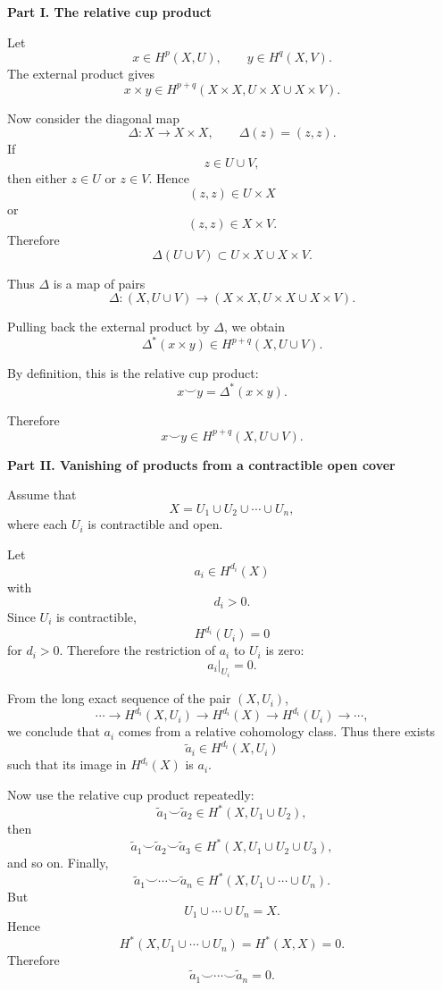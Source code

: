 \begin{solution}

\medskip
\noindent\textbf{Part I. The relative cup product}\par
\smallskip


Let
\[
x\in H^p(X,U),
\qquad
y\in H^q(X,V).
\]
The external product gives
\[
x\times y
\in
H^{p+q}(X\times X, U\times X\cup X\times V).
\]

Now consider the diagonal map
\[
\Delta:X\to X\times X,
\qquad
\Delta(z)=(z,z).
\]
If
\[
z\in U\cup V,
\]
then either \(z\in U\) or \(z\in V\). Hence
\[
(z,z)\in U\times X
\]
or
\[
(z,z)\in X\times V.
\]
Therefore
\[
\Delta(U\cup V)
\subset
U\times X\cup X\times V.
\]

Thus \(\Delta\) is a map of pairs
\[
\Delta:
(X,U\cup V)
\longrightarrow
(X\times X, U\times X\cup X\times V).
\]

Pulling back the external product by \(\Delta\), we obtain
\[
\Delta^*(x\times y)
\in
H^{p+q}(X,U\cup V).
\]

By definition, this is the relative cup product:
\[
x\smile y
=
\Delta^*(x\times y).
\]

Therefore
\[
\boxed{
	x\smile y\in H^{p+q}(X,U\cup V).
}
\]


\medskip
\noindent\textbf{Part II. Vanishing of products from a contractible open cover}\par
\smallskip


Assume that
\[
X=U_1\cup U_2\cup \cdots \cup U_n,
\]
where each \(U_i\) is contractible and open.

Let
\[
a_i\in H^{d_i}(X)
\]
with
\[
d_i>0.
\]
Since \(U_i\) is contractible,
\[
H^{d_i}(U_i)=0
\]
for \(d_i>0\). Therefore the restriction of \(a_i\) to \(U_i\) is zero:
\[
a_i|_{U_i}=0.
\]

From the long exact sequence of the pair \((X,U_i)\),
\[
\cdots
\to
H^{d_i}(X,U_i)
\to
H^{d_i}(X)
\to
H^{d_i}(U_i)
\to
\cdots,
\]
we conclude that \(a_i\) comes from a relative cohomology class. Thus there exists
\[
\widetilde a_i\in H^{d_i}(X,U_i)
\]
such that its image in \(H^{d_i}(X)\) is \(a_i\).

Now use the relative cup product repeatedly:
\[
\widetilde a_1\smile \widetilde a_2
\in
H^*(X,U_1\cup U_2),
\]
then
\[
\widetilde a_1\smile \widetilde a_2\smile \widetilde a_3
\in
H^*(X,U_1\cup U_2\cup U_3),
\]
and so on. Finally,
\[
\widetilde a_1\smile \cdots \smile \widetilde a_n
\in
H^*(X,U_1\cup\cdots\cup U_n).
\]
But
\[
U_1\cup\cdots\cup U_n=X.
\]
Hence
\[
H^*(X,U_1\cup\cdots\cup U_n)
=
H^*(X,X)
=
0.
\]
Therefore
\[
\widetilde a_1\smile\cdots\smile \widetilde a_n=0.
\]


\end{solution}
